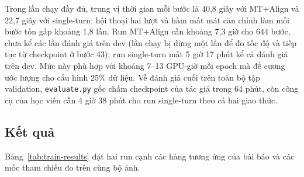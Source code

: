 Trong lần chạy đầy đủ, trung vị thời gian mỗi bước là 40,8 giây với MT+Align và 22,7 giây với single-turn: hội thoại hai lượt và hàm mất mát căn chỉnh làm mỗi bước tốn gấp khoảng 1,8 lần. Run MT+Align cần khoảng 7,3 giờ cho 644 bước, chưa kể các lần đánh giá trên dev (lần chạy bị dừng một lần để đo tốc độ và tiếp tục từ checkpoint ở bước 43); run single-turn mất 5 giờ 17 phút kể cả đánh giá trên dev. Mức này phù hợp với khoảng 7--13 GPU-giờ mỗi epoch mà đề cương ước lượng cho cấu hình 25\% dữ liệu. Về đánh giá cuối trên toàn bộ tập validation, \texttt{evaluate.py} gốc chấm checkpoint của tác giả trong 64 phút, còn công cụ của học viên cần 4 giờ 38 phút cho run single-turn theo cả hai giao thức.

\subsection{Kết quả}

Bảng~\ref{tab:train-results} đặt hai run cạnh các hàng tương ứng của bài báo và các mốc tham chiếu đo trên cùng bộ ảnh.

